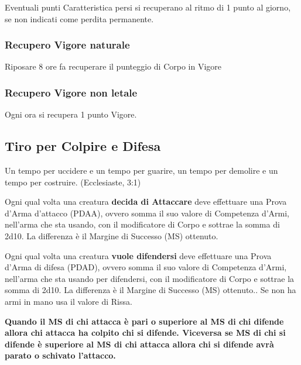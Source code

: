 \documentclass[12pt,a4paper,twoside,openany]{book}
\begin{document}
\begin{multicols}{2}
Eventuali punti Caratteristica persi si recuperano al ritmo di 1 punto al giorno, se non indicati come perdita permanente.

\subsubsection{Recupero Vigore naturale}\label{recuperopuntiferitanaturale} 

Riposare 8 ore fa recuperare il punteggio di Corpo in Vigore

\subsubsection{Recupero Vigore non letale}\label{recuperopuntiferitanonletali}\hypertarget{recuperopuntiferitanonletali}{}

Ogni ora si recupera 1 punto Vigore.

\subsection{Tiro per Colpire e Difesa}\label{tiropercolpireedifesa}

\begin{changemargin}{0.3cm}{0.3cm}\begin{enfasi}{
Un tempo per uccidere e un tempo per guarire,
un tempo per demolire e un tempo per costruire. (Ecclesiaste, 3:1)
}\end{enfasi}\end{changemargin}\medskip

Ogni qual volta una creatura \textbf{decida di Attaccare} deve effettuare una Prova d'Arma d'attacco (PDAA), ovvero somma il suo valore di Competenza d'Armi, nell'arma che sta usando, con il modificatore di Corpo e sottrae la somma di 2d10. La differenza è il Margine di Successo (MS) ottenuto.

Ogni qual volta una creatura \textbf{vuole difendersi} deve effettuare una Prova d'Arma di difesa (PDAD), ovvero somma il suo valore di Competenza d'Armi, nell'arma che sta usando per difendersi, con il modificatore di Corpo e sottrae la somma di 2d10. La differenza è il Margine di Successo (MS) ottenuto..
Se non ha armi in mano usa il valore di Rissa.

\textbf{Quando il MS di chi attacca è pari o superiore al MS di chi difende allora chi attacca ha colpito chi si difende. Viceversa se MS di chi si difende è superiore al MS di chi attacca allora chi si difende avrà parato o schivato l'attacco.}


\end{multicols}
\end{document}
